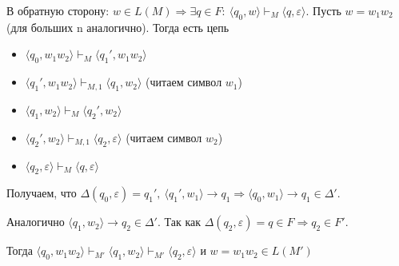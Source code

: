     


\par В обратную сторону: $w \in L(M) \Rightarrow \exists q \in F: \: \langle q_0, w \rangle \vdash_M \langle q, \varepsilon \rangle$. Пусть $w=w_1w_2$ (для больших n аналогично). Тогда есть цепь \begin{itemize}
    \item $\langle q_0, w_1w_2 \rangle \vdash_M \langle q_1', w_1w_2 \rangle$
    \item $\langle q_1', w_1w_2 \rangle \vdash_{M,1} \langle q_1, w_2 \rangle$ (читаем символ $w_1$)
    \item $\langle q_1, w_2 \rangle \vdash_M \langle q_2', w_2 \rangle$
    \item $\langle q_2', w_2 \rangle \vdash_{M,1} \langle q_2, \varepsilon \rangle$ (читаем символ $w_2$)
    \item $\langle q_2, \varepsilon \rangle \vdash_M \langle q, \varepsilon \rangle$
\end{itemize}
\par Получаем, что $\Delta(q_0, \varepsilon)=q_1', \: \langle q_1', w_1 \rangle \rightarrow q_1 \Rightarrow \langle q_0, w_1 \rangle \rightarrow q_1 \in \Delta'$.

\par Аналогично $\langle q_1, w_2 \rangle \rightarrow q_2 \in \Delta'$. Так как $\Delta(q_2, \varepsilon)=q \in F \Rightarrow q_2 \in F'$.
\par Тогда $\langle q_0, w_1w_2 \rangle \vdash_{M'} \langle q_1, w_2 \rangle \vdash_{M'} \langle q_2, \varepsilon \rangle$ и $w=w_1w_2 \in L(M')$
\EndProof

